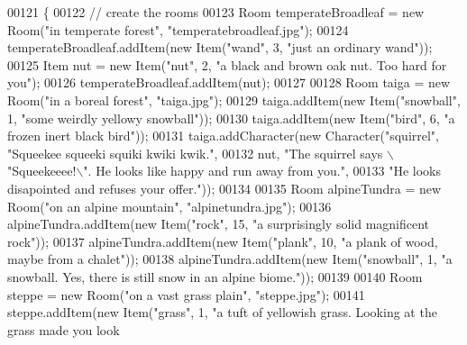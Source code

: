 \begin{DoxyCode}
00121                                \{
00122         \textcolor{comment}{// create the rooms}
00123         Room temperateBroadleaf = \textcolor{keyword}{new} Room(\textcolor{stringliteral}{"in temperate forest"}, \textcolor{stringliteral}{"temperatebroadleaf.jpg"});
00124         temperateBroadleaf.addItem(\textcolor{keyword}{new} Item(\textcolor{stringliteral}{"wand"}, 3, \textcolor{stringliteral}{"just an ordinary wand"}));
00125         Item nut = \textcolor{keyword}{new} Item(\textcolor{stringliteral}{"nut"}, 2, \textcolor{stringliteral}{"a black and brown oak nut. Too hard for you"});
00126         temperateBroadleaf.addItem(nut);
00127 
00128         Room taiga = \textcolor{keyword}{new} Room(\textcolor{stringliteral}{"in a boreal forest"}, \textcolor{stringliteral}{"taiga.jpg"});
00129         taiga.addItem(\textcolor{keyword}{new} Item(\textcolor{stringliteral}{"snowball"}, 1, \textcolor{stringliteral}{"some weirdly yellowy snowball"}));
00130         taiga.addItem(\textcolor{keyword}{new} Item(\textcolor{stringliteral}{"bird"}, 6, \textcolor{stringliteral}{"a frozen inert black bird"}));
00131         taiga.addCharacter(\textcolor{keyword}{new} Character(\textcolor{stringliteral}{"squirrel"}, \textcolor{stringliteral}{"Squeekee squeeki squiki kwiki kwik."},
00132                 nut, \textcolor{stringliteral}{"The squirrel says \(\backslash\)"Squeekeeee!\(\backslash\)". He looks like happy and run away from you."},
00133                 \textcolor{stringliteral}{"He looks disapointed and refuses your offer."}));
00134 
00135         Room alpineTundra = \textcolor{keyword}{new} Room(\textcolor{stringliteral}{"on an alpine mountain"}, \textcolor{stringliteral}{"alpinetundra.jpg"});
00136         alpineTundra.addItem(\textcolor{keyword}{new} Item(\textcolor{stringliteral}{"rock"}, 15, \textcolor{stringliteral}{"a surprisingly solid magnificent rock"}));
00137         alpineTundra.addItem(\textcolor{keyword}{new} Item(\textcolor{stringliteral}{"plank"}, 10, \textcolor{stringliteral}{"a plank of wood, maybe from a chalet"}));
00138         alpineTundra.addItem(\textcolor{keyword}{new} Item(\textcolor{stringliteral}{"snowball"}, 1, \textcolor{stringliteral}{"a snowball. Yes, there is still snow in an alpine
       biome."}));
00139 
00140         Room steppe = \textcolor{keyword}{new} Room(\textcolor{stringliteral}{"on a vast grass plain"}, \textcolor{stringliteral}{"steppe.jpg"});
00141         steppe.addItem(\textcolor{keyword}{new} Item(\textcolor{stringliteral}{"grass"}, 1, \textcolor{stringliteral}{"a tuft of yellowish grass. Looking at the grass made you look
}
\end{DoxyCode}
